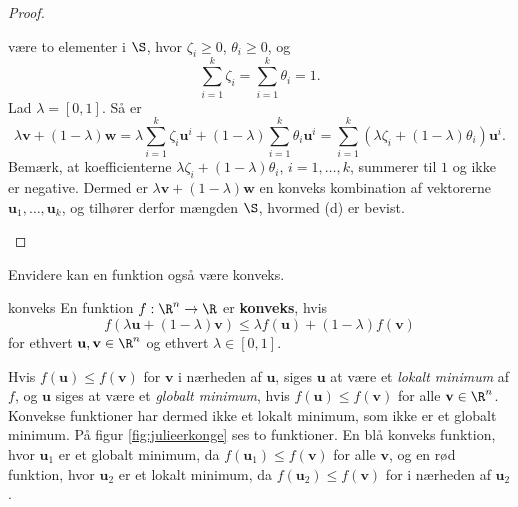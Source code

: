 \begin{proof}
\begin{enumerate}[label=(\alph*)]
%
være to elementer i $\S$, hvor $ \zeta_i \geq 0$, $ \theta_i \geq 0$, og $$ \sum_{i=1}^{k} \zeta_i = \sum_{i=1}^{k} \theta_i = 1.$$ 
Lad $ \lambda = [0,1].$
Så er $$\lambda \textbf{v} + (1 - \lambda ) \textbf{w} = \lambda \sum_{i=1}^k \zeta_i \textbf{u}^i + (1 - \lambda) \sum_{i=1}^k \theta_i \textbf{u}^i = \sum_{i=1}^k (\lambda \zeta_i + (1-\lambda )\theta_i ) \textbf{u}^i.$$
Bemærk, at koefficienterne $ \lambda \zeta_i + (1 - \lambda) \theta_i$, $i = 1, \ldots, k$, summerer til $1$ og ikke er negative. 
Dermed er $ \lambda \textbf{v} + (1 - \lambda ) \textbf{w}$ en konveks kombination af vektorerne $\textbf{u}_1, \ldots, \textbf{u}_k$, og tilhører derfor mængden $\S$, hvormed (d) er bevist. 
\end{enumerate}
\end{proof}
% 
Envidere kan en funktion også være konveks.
\begin{defn}{}{konveks}
En funktion $f: \R^n \rightarrow \R$ er \textbf{konveks}, hvis 
$$f(\lambda \textbf{u} + (1- \lambda ) \textbf{v}) \leq \lambda f( \textbf{u}) + (1- \lambda ) f(\textbf{v}) $$ 
for ethvert $\textbf{u}, \textbf{v} \in \R^n$ og ethvert $\lambda \in [0,1]$.
\end{defn}
\noindent
% 
Hvis $f(\mathbf{u}) \leq f(\mathbf{v})$ for $\textbf{v}$ i nærheden af $\mathbf{u}$, siges $\mathbf{u}$ at være et \textit{lokalt minimum} af $f$, og $\mathbf{u}$ siges at være et \textit{globalt minimum}, hvis $f(\mathbf{u}) \leq f(\mathbf{v})$ for alle $\mathbf{v} \in \R^n$.
Konvekse funktioner har dermed ikke et lokalt minimum, som ikke er et globalt minimum.
På figur \ref{fig:julieerkonge} ses to funktioner. 
En blå konveks funktion, hvor $\mathbf{u}_1$ er et globalt minimum, da $f(\mathbf{u}_1) \leq f(\mathbf{v})$ for alle $\mathbf{v}$, 
og en rød funktion, hvor $\mathbf{u}_2$ er et lokalt minimum, da $f(\mathbf{u}_2) \leq f(\mathbf{v})$ for i nærheden af $\mathbf{u}_2$. 
%

%